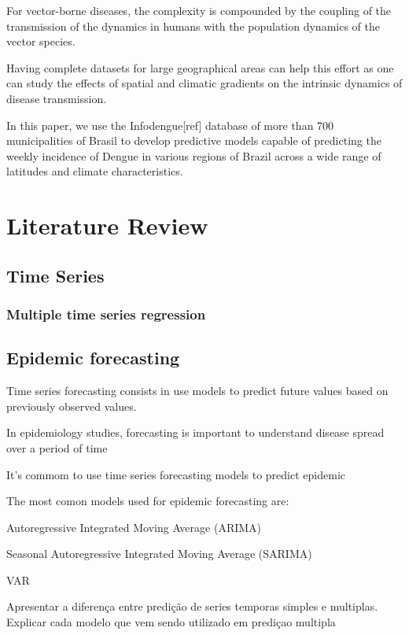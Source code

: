 \documentclass[12pt]{report}
\begin{document}
For vector-borne diseases, the complexity is compounded by the coupling of the transmission of the dynamics in humans with the population dynamics of the vector species.

Having complete datasets for large geographical areas can help this effort as one can study the effects of spatial and climatic gradients on the intrinsic dynamics of disease transmission. 

In this paper, we use the Infodengue[ref] database of more than 700 municipalities of Brasil to develop predictive models capable of predicting the weekly incidence of Dengue in various regions of Brazil across a wide range of latitudes and climate characteristics.

\newpage
\chapter{Literature Review}

\section{Time Series}
\subsection{Multiple time series regression}


\section{Epidemic forecasting}
 
Time series forecasting consists in use models to predict future values based on previously observed values.
 
 
In epidemiology studies, forecasting is important to understand disease spread over a period of time

It's commom to use time series forecasting models to predict epidemic
 
The most comon models used for epidemic forecasting are:
 
 \begin{description}
  \item Autoregressive Integrated Moving Average (ARIMA)
  \item Seasonal Autoregressive Integrated Moving Average (SARIMA)
  \item VAR
 \end{description}

Apresentar a diferença entre predição de series temporas simples e multiplas. Explicar cada modelo que vem sendo utilizado em prediçao multipla
\end{document}

